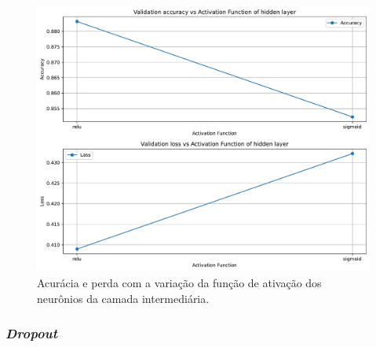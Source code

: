 \begin{figure}[H]
\centering
\includegraphics[width=0.75\linewidth]{../../plot/mlp/search_activation_fnc}
\caption{Acurácia e perda com a variação da função de ativação dos neurônios da camada intermediária.}
\label{fig:search_activation_fnc}
\end{figure}

\subsubsection{\textit{Dropout}}

